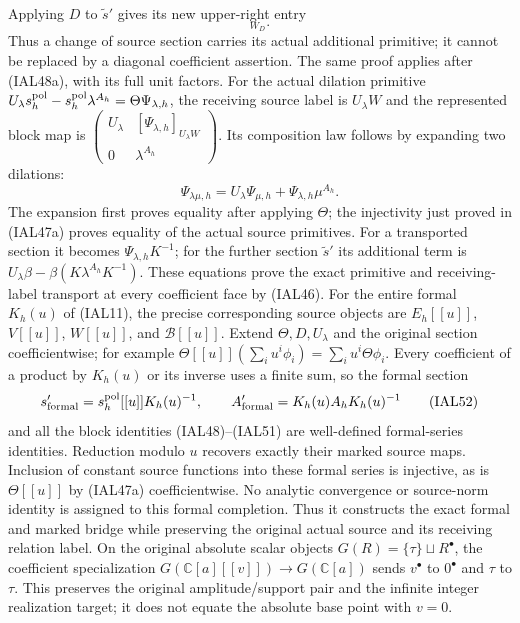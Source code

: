 \documentclass[11pt,a4paper]{article}
\theoremstyle{definition}
\begin{document}
Applying $D$ to $\widetilde s'$ gives its new upper-right entry
\begin{equation}
 [\phi_*\ell_hK^{-1}+D\beta-\beta(KA_hK^{-1})]_{W_D}.
                                                        \tag{IAL50}
\end{equation}
Thus a change of source section carries its actual additional
primitive; it cannot be replaced by a diagonal coefficient assertion.
The same proof applies after (IAL48a), with its full unit factors.
For the actual dilation primitive
$U_\lambda s_h^{\rm pol}-s_h^{\rm pol}\lambda^{A_h}
=\Theta\Psi_{\lambda,h}$, the receiving source label is
$U_\lambda W$ and the represented block map is
$\left(\begin{smallmatrix}U_\lambda&[\Psi_{\lambda,h}]_{U_\lambda W}
\\0&\lambda^{A_h}\end{smallmatrix}\right)$.
Its composition law follows by expanding two dilations:
\begin{equation}
 \Psi_{\lambda\mu,h}
 =U_\lambda\Psi_{\mu,h}
            +\Psi_{\lambda,h}\mu^{A_h}.              \tag{IAL51}
\end{equation}
The expansion first proves equality after applying $\Theta$; the
injectivity just proved in (IAL47a) proves equality of the actual
source primitives.
For a transported section it becomes $\Psi_{\lambda,h}K^{-1}$;
for the further section $\widetilde s'$ its additional term is
$U_\lambda\beta-\beta(K\lambda^{A_h}K^{-1})$.
These equations prove the exact primitive and receiving-label
transport at every coefficient face by (IAL46).
For the entire formal $K_h(u)$ of (IAL11), the precise corresponding
source objects are $E_h[[u]]$, $V[[u]]$, $W[[u]]$, and
$\mathscr B[[u]]$.  Extend $\Theta,D,U_\lambda$ and the original
section coefficientwise; for example
$\Theta[[u]](\sum_i u^i\phi_i)=\sum_i u^i\Theta\phi_i$.
Every coefficient of a product by $K_h(u)$ or its inverse uses a
finite sum, so the formal section
\begin{equation}
 s'_{\rm formal}=s_h^{\rm pol}[[u]]K_h(u)^{-1},\qquad
 A'_{\rm formal}=K_h(u)A_hK_h(u)^{-1}                 \tag{IAL52}
\end{equation}
and all the block identities (IAL48)--(IAL51) are well-defined
formal-series identities.  Reduction modulo $u$ recovers exactly
their marked source maps.  Inclusion of constant source functions
into these formal series is injective, as is $\Theta[[u]]$ by
(IAL47a) coefficientwise.  No analytic convergence or source-norm
identity is assigned to this formal completion.  Thus it constructs
the exact formal and marked bridge while preserving the original
actual source and its receiving relation label.
On the original absolute scalar objects
$G(R)=\{\tau\}\sqcup R^\bullet$, the coefficient specialization
$G(\mathbb C[a][[v]])\to G(\mathbb C[a])$ sends $v^\bullet$ to
$0^\bullet$ and $\tau$ to $\tau$.  This preserves the original
amplitude/support pair and the infinite integer realization target;
it does not equate the absolute base point with $v=0$.
\end{document}

